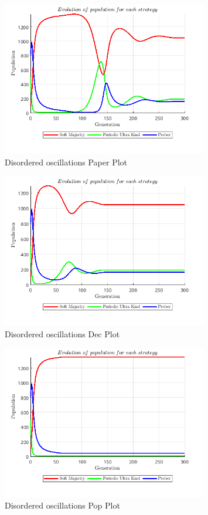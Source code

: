 \documentclass[12pt]{report}
\begin{document}
\begin{figure}[H]
    \centering
    \includegraphics[width=0.8\textwidth]{disordered_oscillations_paper.png}
    \caption{Disordered oscillations Paper Plot}
\end{figure}
\begin{figure}[H]
    \centering
    \includegraphics[width=0.8\textwidth]{disordered_oscillations_dec.png}
    \caption{Disordered oscillations Dec Plot}
\end{figure}
\begin{figure}[H]
    \centering
    \includegraphics[width=0.8\textwidth]{disordered_oscillations_pop.png}
    \caption{Disordered oscillations Pop Plot}
\end{figure}
\end{document}
